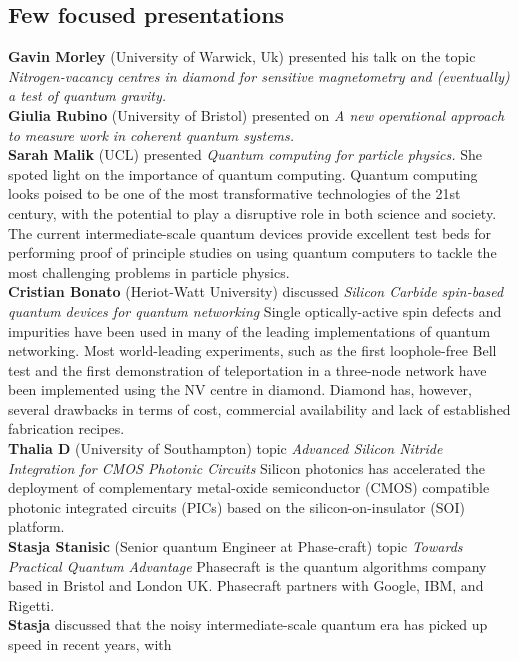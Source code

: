 \documentclass[a4paper, 12pt]{scrartcl}
\begin{document}
  \subsection{Few focused presentations}
  \textbf{Gavin Morley} (University of Warwick, Uk) presented his talk on the topic \textit{Nitrogen-vacancy centres in 
  diamond for sensitive magnetometry and (eventually) a test of quantum gravity.} \\
  \textbf{Giulia Rubino} (University of Bristol) presented on \textit{A new operational approach
  to measure work in coherent quantum systems.}\\
  \textbf{Sarah Malik} (UCL) presented \textit{Quantum computing for particle physics.} She spoted light on the
  importance of quantum computing. Quantum computing looks poised to be one of the most transformative technologies 
  of the 21st century, with the potential to play a disruptive role in both science and society. 
  The current intermediate-scale quantum devices provide excellent test beds for performing proof 
  of principle studies on using quantum computers to tackle the most challenging problems in 
  particle physics.\\
  \textbf{Cristian Bonato} (Heriot-Watt University) discussed \textit{Silicon Carbide spin-based quantum devices for quantum networking} Single 
  optically-active spin defects and impurities have been used in many of the leading implementations of quantum networking. 
  Most world-leading experiments, such as the first loophole-free Bell test and the first demonstration of 
  teleportation in a three-node network have been implemented using the NV centre in diamond. Diamond has, however, 
  several drawbacks in terms of cost, commercial availability and lack of established fabrication recipes.\\
  \textbf{Thalia D} (University of Southampton) topic \textit{Advanced Silicon Nitride Integration for CMOS Photonic Circuits} 
  Silicon photonics has accelerated the deployment of complementary metal-oxide semiconductor (CMOS) compatible photonic integrated 
  circuits (PICs) based on the silicon-on-insulator (SOI) platform.\\
  \textbf{Stasja Stanisic} (Senior quantum Engineer at Phase-craft) topic \textit{Towards Practical Quantum Advantage}
  Phasecraft is the quantum algorithms company based in Bristol and London UK. Phasecraft partners with Google, IBM, and Rigetti.\\
  \textbf{Stasja} discussed that the noisy intermediate-scale quantum era has picked up speed in recent years, with 
\end{document}
